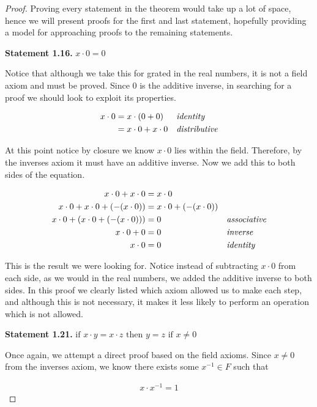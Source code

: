 \documentclass[twoside]{report}
\newcommand{\header}[2]{\begin{flushright} \textbf{#1} #2 \end{flushright}}
\begin{document}
\begin{proof}
	Proving every statement in the theorem would take up a lot of space, hence we will present proofs for the first and last statement, hopefully providing a model for approaching proofs to the remaining statements.
	
	\header{Statement 1.16. }{$x \cdot 0 = 0$}
	
	Notice that although we take this for grated in the real numbers, it is not a field axiom and must be proved. Since 0 is the additive inverse, in searching for a proof we should look to exploit its properties.

	\begin{align*}
		x \cdot 0 &= x \cdot (0 + 0) &&\emph{identity} \\
		&= x \cdot 0 + x \cdot 0 &&\emph{distributive}
	\end{align*}
	
	At this point notice by closure we know $x \cdot 0$ lies within the field. Therefore, by the inverses axiom it must have an additive inverse. Now we add this to both sides of the equation.
	
	\begin{align*}
		x \cdot 0 + x \cdot 0 &= x \cdot 0 && \\
		x \cdot 0 + x \cdot 0 + (-(x \cdot 0)) &= x \cdot 0 + (-(x \cdot 0)) && \\
		x \cdot 0 + (x \cdot 0 + (-(x \cdot 0))) &= 0  &&\emph{associative} \\
		x \cdot 0 + 0 &= 0 &&\emph{inverse} \\
		x \cdot 0 &= 0 &&\emph{identity}
	\end{align*}
	
	This is the result we were looking for. Notice instead of subtracting $x \cdot 0$ from each side, as we would in the real numbers, we added the additive inverse to  both sides. In this proof we clearly listed which axiom allowed us to make each step, and although this is not necessary, it makes it less likely to perform an operation which is not allowed.
	
	\header{Statement 1.21. }{$\text{if } x \cdot y = x \cdot z \text{ then } y = z \text { if } x \neq 0$}
	
	Once again, we attempt a direct proof based on the field axioms. Since $x \neq 0$ from the inverses axiom, we know there exists some $x^{-1} \in F$ such that
	
	\begin{align*}
		x \cdot x^{-1} = 1
	\end{align*}
	

\end{proof}
\end{document}
